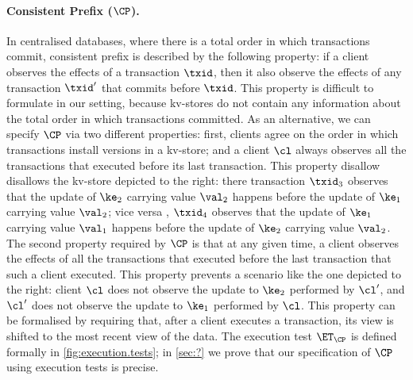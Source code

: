 
\paragraph{Consistent Prefix ($\CP$).}
In centralised databases, where there is a total order in which transactions commit, 
consistent prefix is described  by the following property: if a client 
observes the effects of a transaction $\txid$, then it also observe the effects 
of any transaction $\txid'$ that commits before $\txid$. This property is 
difficult to formulate in our setting, because kv-stores do not contain any 
information about the total order in which transactions committed. 
As an alternative, we can specify $\CP$ via two different properties: 
first, clients agree on the 
order in which transactions install versions in a kv-store; and a client $\cl$ always 
observes all the transactions that executed before its last transaction. This property 
disallow disallows the kv-store depicted to the right: there 
transaction $\txid_{3}$ observes that the 
update of $\ke_2$ carrying value $\val_2$ happens before 
the update of $\ke_1$ carrying value $\val_2$; vice versa , 
$\txid_{4}$ observes that the update of $\ke_1$ carrying value $\val_1$ 
happens before the update of $\ke_2$ carrying value  $\val_2$. 
The second property required by $\CP$ is that at any given time, 
a client observes the effects of all the transactions that  
executed before the last transaction that such a client executed. 
This property prevents a scenario like the one depicted to the 
right: client $\cl$ does not observe the update to $\ke_2$ performed 
by $\cl'$, and $\cl'$ does not observe the update to $\ke_1$ performed 
by $\cl$. This property can be formalised by requiring that, after 
a client executes a transaction, its view is shifted to the most recent 
view of the data. The execution test $\ET_{\CP}$ is defined formally 
in \cref{fig:execution.tests}; in \cref{sec:?} we prove that our specification  
of $\CP$ using execution tests is precise. 


